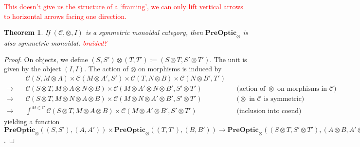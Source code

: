 \documentclass[11pt,a4paper]{article}
\theoremstyle{plain}
\newtheorem{theorem}{Theorem}[section]
\theoremstyle{definition}
\newcommand{\C}{\mathscr{C}}
\newcommand{\PreOptic}{\mathbf{PreOptic}}
\newcommand{\todo}[1]{\textcolor{red}{\small #1}}
\begin{document}
\todo{This doesn't give us the structure of a `framing', we can only lift vertical arrows to horizontal arrows facing one direction.}

\begin{theorem}
If $(\C, \otimes, I)$ is a symmetric monoidal category, then $\PreOptic_\otimes$ is also symmetric monoidal. \todo{braided?}
\end{theorem}
\begin{proof}
On objects, we define $(S, S') \otimes (T, T') := (S \otimes T, S' \otimes T')$. The unit is given by the object $(I, I)$. The action of $\otimes$ on morphisms is induced by
\begin{align*}
&\C(S, M \otimes A) \times \C(M \otimes A', S') \times \C(T, N \otimes B) \times \C(N \otimes B', T')\\
\to \quad&\C(S \otimes T, M \otimes A \otimes N \otimes B) \times \C(M \otimes A' \otimes N \otimes B', S' \otimes T') && \text{(action of $\otimes$ on morphisms in $\C$)}\\
\to \quad&\C(S \otimes T, M \otimes N \otimes A \otimes B) \times \C(M \otimes N \otimes A' \otimes B', S' \otimes T') && \text{($\otimes$ in $\C$ is symmetric)}\\
\to \quad&\int^{M \in \C} \C(S \otimes T, M \otimes A \otimes B) \times \C(M \otimes A' \otimes B', S' \otimes T') && \text{(inclusion into coend)}
\end{align*}
yielding a function $\PreOptic_\otimes((S, S'), (A, A')) \times \PreOptic_\otimes((T, T'), (B, B')) \to \PreOptic_\otimes((S \otimes T, S' \otimes T'), (A \otimes B, A' \otimes B'))$. 


\end{proof}
\end{document}
